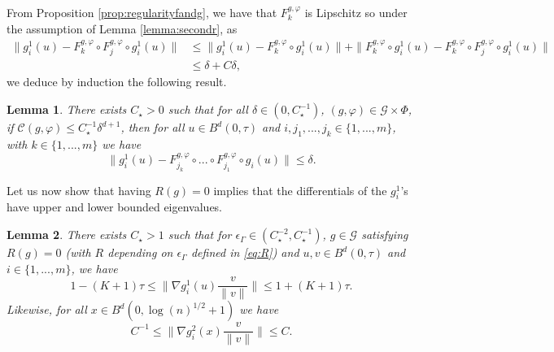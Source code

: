\documentclass[10pt]{article}
\newtheorem{lemma}{Lemma}
\begin{document}
From Proposition \ref{prop:regularityfandg}, we have that $F^{g,\varphi}_{k}$ is Lipschitz so under the assumption of  Lemma \ref{lemma:secondr}, as
\begin{align*}
    \| g_i^1(u)-F^{g,\varphi}_{k}\circ F^{g,\varphi}_{j} \circ g_i^1(u)\|& \leq \|g_i^1(u)-F^{g,\varphi}_{k}\circ g_i^1(u)\| + \|F^{g,\varphi}_{k}\circ  g_i^1(u)-F^{g,\varphi}_{k}\circ F^{g,\varphi}_{j} \circ g_i^1(u)\|\\
    & \leq \delta+ C\delta,
\end{align*}
we deduce by induction the following result.

 \begin{lemma}\label{lemma:secondrbis} There exists $C_\star>0$ such that for all $\delta\in (0,C_\star^{-1})$, $(g,\varphi)\in \mathcal{G}\times  \Phi$, if $\mathcal{C}(g,\varphi)\leq C_\star^{-1}\delta^{d+1}$, then  
    for all $u\in B^d(0,\tau)$ and $i,j_1,...,j_k\in \{1,...,m\}$, with $k\in \{1,...,m\}$ we have
    $$\|g_i^1(u)-F^{g,\varphi}_{j_k}\circ...\circ F^{g,\varphi}_{j_1} \circ g_i(u)\|
    \leq \delta.$$
\end{lemma}
 


Let us now show that having $R(g)=0$ implies that the differentials of the $g_i^1$'s have upper and lower bounded eigenvalues.
\begin{lemma}\label{lemma:thirdr} There exists $C_\star>1$ such that for $\epsilon_\Gamma \in (C_\star^{-2},C_\star^{-1})$, $g\in \mathcal{G}$ satisfying $R(g)=0$ (with $R$ depending on $\epsilon_\Gamma$ defined in \eqref{eq:R}) and
     $u,v\in B^d(0,\tau)$ and $i\in \{1,...,m\}$, we have
    $$1-(K+1)\tau\leq \|\nabla g_i^1(u)\frac{v}{\|v\|}\|\leq 1+(K+1)\tau.$$
   Likewise, for all $x\in B^d(0,\log(n)^{1/2}+1)$ we have
   $$C^{-1}\leq \|\nabla g_i^2(x)\frac{v}{\|v\|}\|\leq C.$$
\end{lemma}
\end{document}
